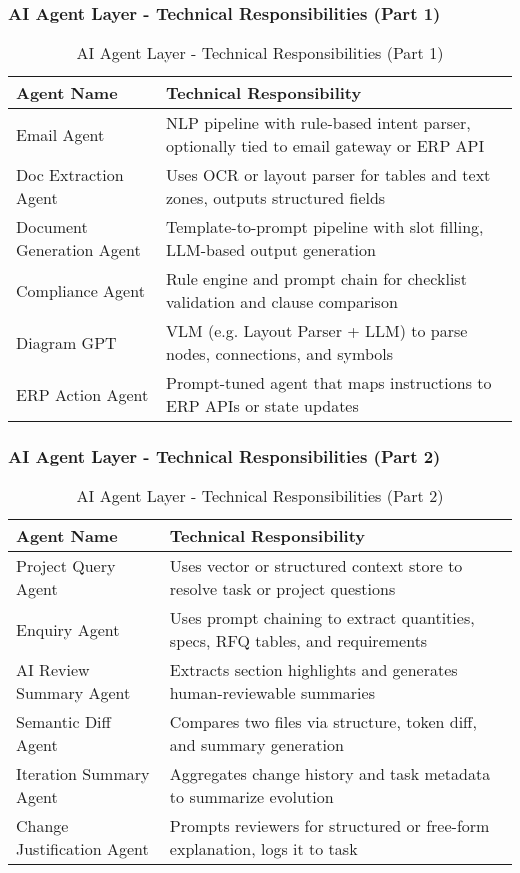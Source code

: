 \begin{frame}
    \frametitle{AI Agent Layer - Technical Responsibilities (Part 1)}
    \begin{table}[h!]
\centering
\renewcommand{\arraystretch}{1.2}
\begin{tabular}{|p{3cm}|p{7cm}|}
\hline
\textbf{Agent Name} & \textbf{Technical Responsibility} \\
\hline
Email Agent & NLP pipeline with rule-based intent parser, optionally tied to email gateway or ERP API \\
\hline
Doc Extraction Agent & Uses OCR or layout parser for tables and text zones, outputs structured fields \\
\hline
Document Generation Agent & Template-to-prompt pipeline with slot filling, LLM-based output generation \\
\hline
Compliance Agent & Rule engine and prompt chain for checklist validation and clause comparison \\
\hline
Diagram GPT & VLM (e.g. Layout Parser + LLM) to parse nodes, connections, and symbols \\
\hline
ERP Action Agent & Prompt-tuned agent that maps instructions to ERP APIs or state updates \\
\hline
\end{tabular}
\caption{AI Agent Layer - Technical Responsibilities (Part 1)}
\end{table}
\end{frame}

\begin{frame}
    \frametitle{AI Agent Layer - Technical Responsibilities (Part 2)}
    \begin{table}[h!]
\centering
\renewcommand{\arraystretch}{1.2}
\begin{tabular}{|p{3cm}|p{7cm}|}
\hline
\textbf{Agent Name} & \textbf{Technical Responsibility} \\
\hline
Project Query Agent & Uses vector or structured context store to resolve task or project questions \\
\hline
Enquiry Agent & Uses prompt chaining to extract quantities, specs, RFQ tables, and requirements \\
\hline
AI Review Summary Agent & Extracts section highlights and generates human-reviewable summaries \\
\hline
Semantic Diff Agent & Compares two files via structure, token diff, and summary generation \\
\hline
Iteration Summary Agent & Aggregates change history and task metadata to summarize evolution \\
\hline
Change Justification Agent & Prompts reviewers for structured or free-form explanation, logs it to task \\
\hline
\end{tabular}
\caption{AI Agent Layer - Technical Responsibilities (Part 2)}
\end{table}
\end{frame}

